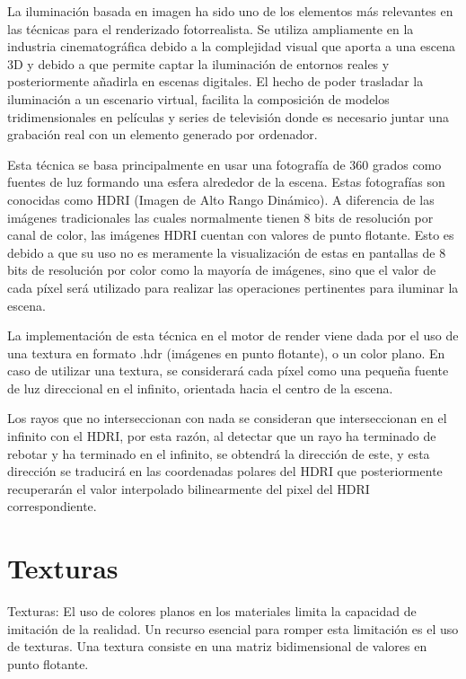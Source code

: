 	La iluminación basada en imagen ha sido uno de los elementos más relevantes en las técnicas para el renderizado fotorrealista. Se utiliza ampliamente en la industria cinematográfica debido a la complejidad visual que aporta a una escena 3D y debido a que permite captar la iluminación de entornos reales y posteriormente añadirla en escenas digitales. El hecho de poder trasladar la iluminación a un escenario virtual, facilita la composición de modelos tridimensionales en películas y series de televisión donde es necesario juntar una grabación real con un elemento generado por ordenador.

	Esta técnica se basa principalmente en usar una fotografía de 360 grados como fuentes de luz formando una esfera alrededor de la escena. Estas fotografías son conocidas como HDRI (Imagen de Alto Rango Dinámico). A diferencia de las imágenes tradicionales las cuales normalmente tienen 8 bits de resolución por canal de color, las imágenes HDRI cuentan con valores de punto flotante. Esto es debido a que su uso no es meramente la visualización de estas en pantallas de 8 bits de resolución por color como la mayoría de imágenes, sino que el valor de cada píxel será utilizado para realizar las operaciones pertinentes para iluminar la escena.

	La implementación de esta técnica en el motor de render viene dada por el uso de una textura en formato .hdr (imágenes en punto flotante), o un color plano. En caso de utilizar una textura, se considerará cada píxel como una pequeña fuente de luz direccional en el infinito, orientada hacia el centro de la escena. 

	Los rayos que no interseccionan con nada se consideran que interseccionan en el infinito con el HDRI, por esta razón, al detectar que un rayo ha terminado de rebotar y ha terminado en el infinito, se obtendrá la dirección de este, y esta dirección se traducirá en las coordenadas polares del HDRI que posteriormente recuperarán el valor interpolado bilinearmente del pixel del HDRI correspondiente.


	\section{Texturas}
	
	Texturas:
	El uso de colores planos en los materiales limita la capacidad de imitación de la realidad. Un recurso esencial para romper esta limitación es el uso de texturas. Una textura consiste en una matriz bidimensional de valores en punto flotante.

